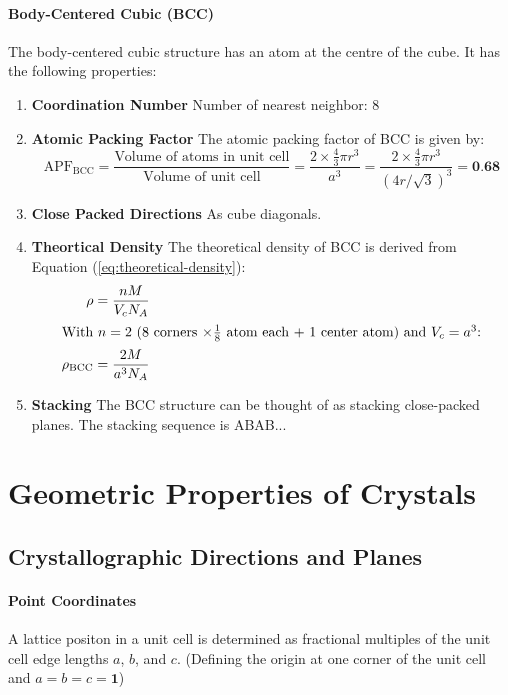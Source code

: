 \documentclass[11pt]{article}
\begin{document}
\paragraph{Body-Centered Cubic (BCC)} The body-centered cubic structure has an atom at the centre of the cube. It has the following properties:
\begin{enumerate}
    \item \textbf{Coordination Number} Number of nearest neighbor: 8
    \item \textbf{Atomic Packing Factor} The atomic packing factor of BCC is given by:
    \begin{equation}
        \text{APF}_\text{BCC} = \frac{\text{Volume of atoms in unit cell}}{\text{Volume of unit cell} } = \frac{2 \times \frac{4}{3}\pi r^3}{a^3} = \frac{2 \times \frac{4}{3}\pi r^3}{(4r/\sqrt{3})^3} = \textbf{0.68}
    \end{equation}
    \item \textbf{Close Packed Directions} As cube diagonals.
    \item \textbf{Theortical Density} The theoretical density of BCC is derived from Equation (\ref{eq:theoretical-density}):
    \begin{align}
        \rho &= \frac{nM}{V_c N_A} \nonumber \\
        \intertext{With $n = 2$ (8 corners $\times \frac{1}{8}$ atom each + 1 center atom) and $V_c = a^3$:}
        \rho_\text{BCC} &= \frac{2M}{a^3 N_A} 
    \end{align}
    \item \textbf{Stacking} The BCC structure can be thought of as stacking close-packed planes. The stacking sequence is ABAB...
\end{enumerate}
\section{Geometric Properties of Crystals}
\subsection{Crystallographic Directions and Planes}
\paragraph{Point Coordinates} A lattice positon in a unit cell is determined as fractional multiples of the unit cell edge lengths $a$, $b$, and $c$. (Defining the origin at one corner of the unit cell and $a=b=c=\textbf{1}$)
\end{document}
